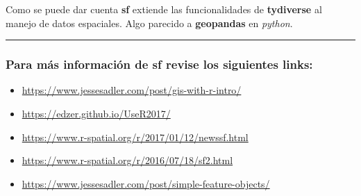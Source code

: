 \documentclass[]{article}
\newenvironment{Shaded}{\begin{snugshade}}{\end{snugshade}}
\newcommand{\KeywordTok}[1]{\textcolor[rgb]{0.13,0.29,0.53}{\textbf{#1}}}
\newcommand{\DataTypeTok}[1]{\textcolor[rgb]{0.13,0.29,0.53}{#1}}
\newcommand{\DecValTok}[1]{\textcolor[rgb]{0.00,0.00,0.81}{#1}}
\newcommand{\StringTok}[1]{\textcolor[rgb]{0.31,0.60,0.02}{#1}}
\newcommand{\OperatorTok}[1]{\textcolor[rgb]{0.81,0.36,0.00}{\textbf{#1}}}
\newcommand{\NormalTok}[1]{#1}
\begin{document}
\begin{Shaded}
\end{Shaded}

 Como se puede dar cuenta \textbf{sf} extiende las funcionalidades de
\textbf{tydiverse} al manejo de datos espaciales. Algo parecido a
\textbf{geopandas} en \emph{python}.

\begin{center}\rule{0.5\linewidth}{\linethickness}\end{center}

\subsubsection{\texorpdfstring{Para más información de \textbf{sf}
revise los siguientes
links:}{Para más información de sf revise los siguientes links:}}\label{para-mas-informacion-de-sf-revise-los-siguientes-links}

\begin{itemize}
\item
  \url{https://www.jessesadler.com/post/gis-with-r-intro/}
\item
  \url{https://edzer.github.io/UseR2017/}
\item
  \url{https://www.r-spatial.org/r/2017/01/12/newssf.html}
\item
  \url{https://www.r-spatial.org/r/2016/07/18/sf2.html}
\item
  \url{https://www.jessesadler.com/post/simple-feature-objects/}
\end{itemize}
\end{document}
